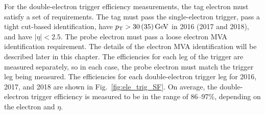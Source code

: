 For the double-electron trigger efficiency measurements, the tag electron must satisfy a set of requirements. The tag must pass 
the single-electron trigger, pass a tight cut-based identification, have $p_{\mathrm{T}}>30\,(35)\,\text{Ge\hspace{-.08em}V}$ in 2016 (2017 and 2018), and have $|\eta|<2.5$. 
The probe electron must pass a loose electron MVA identification requirement. The details of the electron MVA identification will be described later in this chapter.
The efficiencies for each leg 
of the trigger are measured separately, so in each case, the probe electron must match the trigger leg being measured. 
The efficiencies for each double-electron trigger leg for 2016, 2017, and 2018 are shown in Fig.~\ref{fig:ele_trig_SF}.
On average, the double-electron trigger efficiency is measured to be in the range of 86--97\%, depending on the electron \pt and $\eta$.

